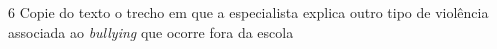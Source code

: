 {\coment{%
}

\num{6} Copie do texto o trecho em que a especialista explica outro tipo de violência associada ao \textit{bullying} que ocorre fora da escola

}
